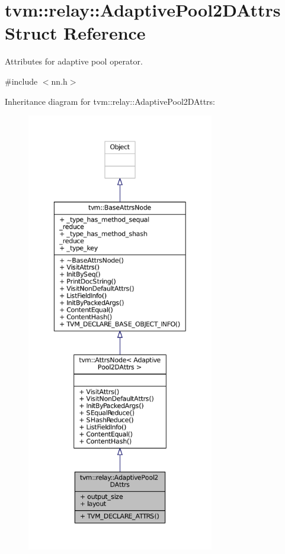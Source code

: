 \hypertarget{structtvm_1_1relay_1_1AdaptivePool2DAttrs}{}\section{tvm\+:\+:relay\+:\+:Adaptive\+Pool2\+D\+Attrs Struct Reference}
\label{structtvm_1_1relay_1_1AdaptivePool2DAttrs}


Attributes for adaptive pool operator.  




{\ttfamily \#include $<$nn.\+h$>$}



Inheritance diagram for tvm\+:\+:relay\+:\+:Adaptive\+Pool2\+D\+Attrs\+:
\nopagebreak
\begin{figure}[H]
\begin{center}
\leavevmode
\includegraphics[height=550pt]{structtvm_1_1relay_1_1AdaptivePool2DAttrs__inherit__graph}
\end{center}
\end{figure}


